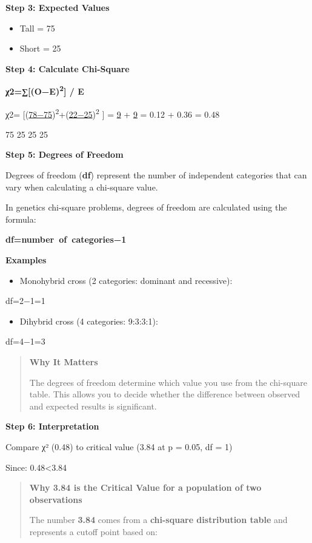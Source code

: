 \documentclass[
  letterpaper,
  DIV=11,
  numbers=noendperiod]{scrreprt}
\providecommand{\tightlist}{%
  \setlength{\itemsep}{0pt}\setlength{\parskip}{0pt}}
\begin{document}
\textbf{Step 3: Expected Values}

\begin{itemize}
\item
  Tall = 75
\item
  Short = 25
\end{itemize}

\textbf{Step 4: Calculate Chi-Square}

\textbf{χ2=∑{[}(O−E)\textsuperscript{2}{]} / E}

χ2= {[}(\ul{78−75})\textsuperscript{2}+(\ul{22−25})\textsuperscript{2}
{]} = \ul{9} + \ul{9} = 0.12 + 0.36 = 0.48

75 25 25 25

\textbf{\hfill\break
Step 5: Degrees of Freedom}

Degrees of freedom (\textbf{df}) represent the number of independent
categories that can vary when calculating a chi-square value.

In genetics chi-square problems, degrees of freedom are calculated using
the formula:

\textbf{df=number~of~categories−1}

\textbf{Examples}

\begin{itemize}
\tightlist
\item
  Monohybrid cross (2 categories: dominant and recessive):
\end{itemize}

df=2−1=1

\begin{itemize}
\tightlist
\item
  Dihybrid cross (4 categories: 9:3:3:1):
\end{itemize}

df=4−1=3

\begin{quote}
\textbf{Why It Matters}

The degrees of freedom determine which value you use from the chi-square
table. This allows you to decide whether the difference between observed
and expected results is significant.
\end{quote}

\textbf{Step 6: Interpretation}

Compare χ² (0.48) to critical value (3.84 at p = 0.05, df = 1)

Since: 0.48\textless3.84

\begin{quote}
\textbf{Why 3.84 is the Critical Value for a population of two
observations}

The number \textbf{3.84} comes from a \textbf{chi-square distribution
table} and represents a cutoff point based on:
\end{quote}
\end{document}
